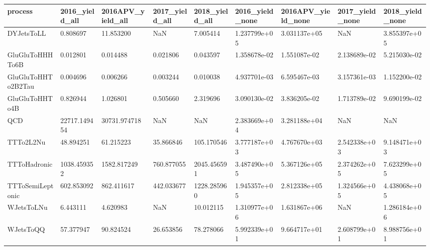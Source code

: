 \begin{tabular}{lllllllll}
\toprule
           process & 2016\_yield\_all & 2016APV\_yield\_all & 2017\_yield\_all & 2018\_yield\_all & 2016\_yield\_none & 2016APV\_yield\_none & 2017\_yield\_none & 2018\_yield\_none \\
\midrule
        DYJetsToLL &       0.808697 &         11.853200 &            NaN &       7.005414 &    1.237799e+05 &       3.031137e+05 &             NaN &    3.855397e+05 \\
   GluGluToHHHTo6B &       0.012801 &          0.014488 &       0.021806 &       0.043597 &    1.358678e-02 &       1.551087e-02 &    2.138689e-02 &    5.215030e-02 \\
GluGluToHHTo2B2Tau &       0.004696 &          0.006266 &       0.003244 &       0.010038 &    4.937701e-03 &       6.595467e-03 &    3.157361e-03 &    1.152200e-02 \\
    GluGluToHHTo4B &       0.826944 &          1.026801 &       0.505660 &       2.319696 &    3.090130e-02 &       3.836205e-02 &    1.713789e-02 &    9.690199e-02 \\
               QCD &   22717.149454 &      30731.974718 &            NaN &            NaN &    2.383669e+04 &       3.281188e+04 &             NaN &             NaN \\
         TTTo2L2Nu &      48.894251 &         61.215223 &      35.866846 &     105.170546 &    3.777187e+03 &       4.767670e+03 &    2.542338e+03 &    9.148471e+03 \\
      TTToHadronic &    1038.459352 &       1582.817249 &     760.877055 &    2045.456591 &    3.487490e+05 &       5.367126e+05 &    2.374262e+05 &    7.623299e+05 \\
  TTToSemiLeptonic &     602.853092 &        862.411617 &     442.033677 &    1228.285960 &    1.945357e+05 &       2.812338e+05 &    1.324566e+05 &    4.438068e+05 \\
        WJetsToLNu &       6.443111 &          4.620983 &            NaN &      10.012115 &    1.310977e+06 &       1.631867e+06 &             NaN &    1.286184e+06 \\
         WJetsToQQ &      57.377947 &         90.824524 &      26.653856 &      78.278066 &    5.992339e+01 &       9.664717e+01 &    2.608799e+01 &    8.988756e+01 \\
\bottomrule
\end{tabular}
